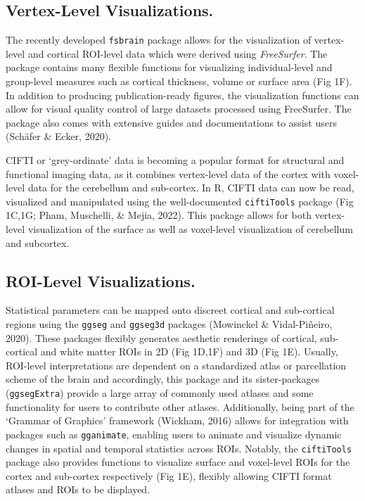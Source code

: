 \documentclass{article}
\begin{document}
\hypertarget{vertex-level-visualizations.}{%
\subsection{Vertex-Level Visualizations.}\label{vertex-level-visualizations.}}

The recently developed \texttt{fsbrain} package allows for the visualization of vertex-level and cortical ROI-level data which were derived using \emph{FreeSurfer}. The package contains many flexible functions for visualizing individual-level and group-level measures such as cortical thickness, volume or surface area (Fig 1F). In addition to producing publication-ready figures, the visualization functions can allow for visual quality control of large datasets processed using FreeSurfer. The package also comes with extensive guides and documentations to assist users (Schäfer \& Ecker, 2020).

CIFTI or `grey-ordinate' data is becoming a popular format for structural and functional imaging data, as it combines vertex-level data of the cortex with voxel-level data for the cerebellum and sub-cortex. In R, CIFTI data can now be read, visualized and manipulated using the well-documented \texttt{ciftiTools} package (Fig 1C,1G; Pham, Muschelli, \& Mejia, 2022). This package allows for both vertex-level visualization of the surface as well as voxel-level visualization of cerebellum and subcortex.

\hypertarget{roi-level-visualizations.}{%
\subsection{ROI-Level Visualizations.}\label{roi-level-visualizations.}}

Statistical parameters can be mapped onto discreet cortical and sub-cortical regions using the \texttt{ggseg} and \texttt{ggseg3d} packages (Mowinckel \& Vidal-Piñeiro, 2020). These packages flexibly generates aesthetic renderings of cortical, sub-cortical and white matter ROIs in 2D (Fig 1D,1F) and 3D (Fig 1E). Usually, ROI-level interpretations are dependent on a standardized atlas or parcellation scheme of the brain and accordingly, this package and its sister-packages (\texttt{ggsegExtra}) provide a large array of commonly used atlases and some functionality for users to contribute other atlases. Additionally, being part of the `Grammar of Graphics' framework (Wickham, 2016) allows for integration with packages such as \texttt{gganimate}, enabling users to animate and visualize dynamic changes in spatial and temporal statistics across ROIs. Notably, the \texttt{ciftiTools} package also provides functions to visualize surface and voxel-level ROIs for the cortex and sub-cortex respectively (Fig 1E), flexibly allowing CIFTI format atlases and ROIs to be displayed.
\end{document}
